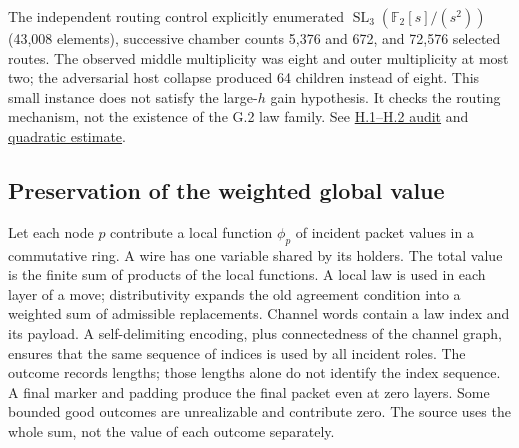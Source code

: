 \documentclass[11pt,letterpaper]{article}
\theoremstyle{definition}\newtheorem{definition}[theorem]{Definition}\newtheorem{example}[theorem]{Example}
\theoremstyle{remark}\newtheorem{remark}[theorem]{Remark}
\newcommand{\F}{\mathbb{F}}
\newcommand{\pub}[3]{\href{https://github.com/anthropics/formal-math/blob/11b6c7e3c927df2658f513b6b68ea7f8929c62c5/vp-vnp/#1\#L#2}{#3}}
\newcommand{\aud}[2]{\href{https://github.com/nousentllc/VP-VNP-Review/blob/567303d0bcf4f9d54390437b137752446e58ccd6/#1}{#2}}
\begin{document}
The independent routing control explicitly enumerated $\operatorname{SL}_3(\F_2[s]/(s^2))$ (43,008 elements), successive chamber counts 5,376 and 672, and 72,576 selected routes. The observed middle multiplicity was eight and outer multiplicity at most two; the adversarial host collapse produced 64 children instead of eight. This small instance does not satisfy the large-$h$ gain hypothesis. It checks the routing mechanism, not the existence of the G.2 law family. See \aud{passes/14b-tower.md}{H.1--H.2 audit} and \pub{Nc/Tow/Load.lean}{364}{quadratic estimate}.

\subsection{Preservation of the weighted global value}\label{sec:glue}
Let each node $p$ contribute a local function $\phi_p$ of incident packet values in a commutative ring. A wire has one variable shared by its holders. The total value is the finite sum of products of the local functions. A local law is used in each layer of a move; distributivity expands the old agreement condition into a weighted sum of admissible replacements. Channel words contain a law index and its payload. A self-delimiting encoding, plus connectedness of the channel graph, ensures that the same sequence of indices is used by all incident roles. The outcome records lengths; those lengths alone do not identify the index sequence. A final marker and padding produce the final packet even at zero layers. Some bounded good outcomes are unrealizable and contribute zero. The source uses the whole sum, not the value of each outcome separately.
\end{document}
